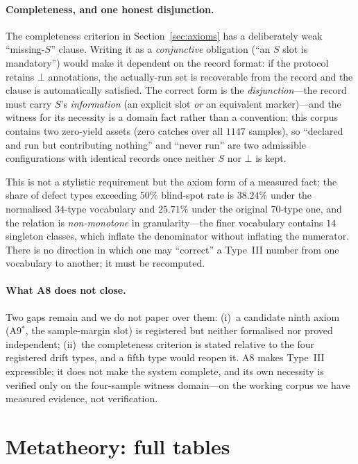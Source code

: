 \documentclass{article}
\begin{document}
\paragraph{Completeness, and one honest disjunction.} The completeness criterion in
Section~\ref{sec:axioms} has a deliberately weak ``missing-$S$'' clause. Writing it as a \emph{conjunctive}
obligation (``an $S$ slot is mandatory'') would make it dependent on the record format: if the protocol
retains $\bot$ annotations, the actually-run set is recoverable from the record and the clause is
automatically satisfied. The correct form is the \emph{disjunction}---the record must carry $S$'s
\emph{information} (an explicit slot \emph{or} an equivalent marker)---and the witness for its necessity is
a domain fact rather than a convention: this corpus contains two zero-yield assets (zero catches over all
$1147$ samples), so ``declared and run but contributing nothing'' and ``never run'' are two admissible
configurations with identical records once neither $S$ nor $\bot$ is kept.

This is not a stylistic requirement but the axiom form of a measured fact: the share of defect types
exceeding $50\%$ blind-spot rate is $38.24\%$ under the normalised $34$-type vocabulary and $25.71\%$ under
the original $70$-type one, and the relation is \emph{non-monotone} in granularity---the finer vocabulary
contains $14$ singleton classes, which inflate the denominator without inflating the numerator. There is no
direction in which one may ``correct'' a Type~III number from one vocabulary to another; it must be
recomputed.

\paragraph{What A8 does not close.} Two gaps remain and we do not paper over them: (i)~a candidate
ninth axiom (A9$^{*}$, the sample-margin slot) is registered but neither formalised nor proved
independent; (ii)~the completeness criterion is stated relative to the four registered drift
types, and a fifth type would reopen it. A8 makes Type~III expressible; it does not make the
system complete, and its own necessity is verified only on the four-sample witness domain---on the
working corpus we have measured evidence, not verification.


\section{Metatheory: full tables}
\label{app:meta}
\end{document}
